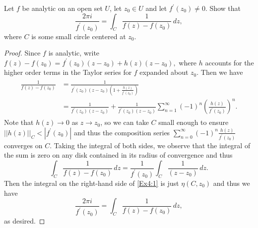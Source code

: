 \documentclass[10pt]{amsart}
\begin{document}
\begin{thm}
  \label{Ex4}
  Let $f$ be analytic on an open set $U$, let $z_0 \in U$ and let $f^{\prime}(z_0) \not = 0$.
  Show that $$\frac{2\pi i}{f^{\prime}(z_0)} = \int_C \frac{1}{f(z) - f(z_0)}\,dz,$$ where $C$ is some small circle centered at $z_0$.
  
  \begin{proof}
    Since $f$ is analytic, write $f(z) - f(z_0) = f^{\prime}(z_0)(z-z_0) + h(z)(z-z_0),$ where $h$ accounts for the higher order terms in the Taylor series for $f$ expanded about $z_0$.
    Then we have
    \begin{align*}
      \begin{split}
        \frac{1}{f(z)-f(z_0)} &= \frac{1}{f^{\prime}(z_0)(z-z_0)(1 + \frac{h(z)}{f^{\prime}(z_0)})}\\ 
        &= \frac{1}{f^{\prime}(z_0)(z-z_0)} + \frac{1}{f^{\prime}(z_0)(z-z_0)}\sum_{n=1}^{\infty}(-1)^n\left(\frac{h(z)}{f^{\prime}(z_0)}\right)^n.
      \end{split}
    \end{align*}
    Note that $h(z) \rightarrow 0$ as $z \rightarrow z_0$, so we can take $C$ small enough to ensure $||h(z)||_C < |f^{\prime}(z_0)|$ and thus the composition series $\sum_{n=0}^{\infty} (-1)^n\frac{h(z)}{f^{\prime}(z_0)}$ converges on $C$.
    Taking the integral of both sides, we observe that the integral of the sum is zero on any disk contained in its radius of convergence and thus
    \begin{equation}
      \label{Ex4:1}
      \int_C \frac{1}{f(z) - f(z_0)}\,dz = \frac{1}{f^{\prime}(z_0)}\int_C\frac{1}{(z-z_0)}\,dz.
    \end{equation}
    Then the integral on the right-hand side of \eqref{Ex4:1} is just $\eta(C,z_0)$ and thus we have
    $$\frac{2\pi i}{f^{\prime}(z_0)} = \int_C \frac{1}{f(z) - f(z_0)}\,dz,$$
    as desired.
  \end{proof}
\end{thm}
\end{document}
